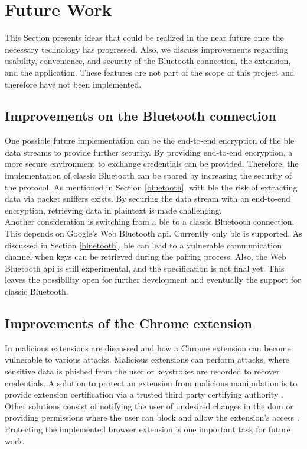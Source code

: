 \section{Future Work} \label{futurework}
This Section presents ideas that could be realized in the near future once the necessary technology has progressed. Also, we discuss improvements regarding usability, convenience, and security of the Bluetooth connection, the extension, and the application. These features are not part of the scope of this project and therefore have not been implemented.

\subsection{Improvements on the Bluetooth connection}
One possible future implementation can be the end-to-end encryption of the \gls{ble} data streams to provide further security. By providing end-to-end encryption, a more secure environment to exchange credentials can be provided. Therefore, the implementation of classic Bluetooth can be spared by increasing the security of the protocol. As mentioned in Section \ref{bluetooth}, with \gls{ble} the risk of extracting data via packet sniffers exists. By securing the data stream with an end-to-end encryption, retrieving data in plaintext is made challenging. \\

Another consideration is switching from a \gls{ble} to a classic Bluetooth connection. This depends on Google's Web Bluetooth \gls{api}. Currently only \gls{ble} is supported. As discussed in Section \ref{bluetooth}, \gls{ble} can lead to a vulnerable communication channel when keys can be retrieved during the pairing process. Also, the Web Bluetooth \gls{api} is still experimental, and the specification is not final yet. This leaves the possibility open for further development and eventually the support for classic Bluetooth.
 
\subsection{Improvements of the Chrome extension}
In \cite{VarshneyBS18} malicious extensions are discussed and how a Chrome extension can become vulnerable to various attacks. Malicious extensions can perform attacks, where sensitive data is phished from the user or keystrokes are recorded to recover credentials. A solution to protect an extension from malicious manipulation is to provide extension certification via a trusted third party certifying authority \cite{VarshneyBS18}. Other solutions consist of notifying the user of undesired changes in the \gls{dom} or providing permissions where the user can block and allow the extension's access \cite{VarshneyBS18}. Protecting the implemented browser extension is one important task for future work. \\

